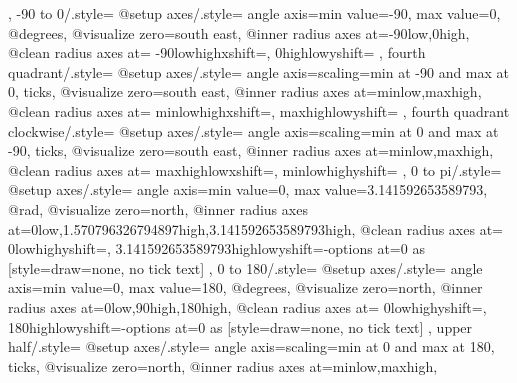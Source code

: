 {{  },
  -90 to 0/.style={
    @setup axes/.style={
      angle axis={min value=-90, max value=0},
      @degrees,
      @visualize zero=south east,
      @inner radius axes at={{-90}{low},{0}{high}},
      @clean radius axes at={%
        {-90}{low}{high}{xshift=}{},%
        {0}{high}{low}{yshift=}{}
      }
    }
  },
  fourth quadrant/.style={
    @setup axes/.style={
      angle axis={scaling=min at -90 and max at 0, ticks},
      @visualize zero=south east,
      @inner radius axes at={{min}{low},{max}{high}},
      @clean radius axes at={%
        {min}{low}{high}{xshift=}{},%
        {max}{high}{low}{yshift=}{}
      }
    }
  },
  fourth quadrant clockwise/.style={
    @setup axes/.style={
      angle axis={scaling=min at 0 and max at -90, ticks},
      @visualize zero=south east,
      @inner radius axes at={{min}{low},{max}{high}},
      @clean radius axes at={%
        {max}{high}{low}{xshift=}{},%
        {min}{low}{high}{yshift=}{}
      }
    }
  },
  0 to pi/.style={
    @setup axes/.style={
      angle axis={min value=0, max value=3.141592653589793},
      @rad,
      @visualize zero=north,
      @inner radius axes at={{0}{low},{1.570796326794897}{high},{3.141592653589793}{high}},
      @clean radius axes at={%
        {0}{low}{high}{yshift=}{},%
        {3.141592653589793}{high}{low}{yshift=-}{options at=0 as
          [{style={draw=none}, no tick text}]}
      }
    }
  },
  0 to 180/.style={
    @setup axes/.style={
      angle axis={min value=0, max value=180},
      @degrees,
      @visualize zero=north,
      @inner radius axes at={{0}{low},{90}{high},{180}{high}},
      @clean radius axes at={%
        {0}{low}{high}{yshift=}{},%
        {180}{high}{low}{yshift=-}{options at=0 as
          [{style={draw=none}, no tick text}]}
      }
    }
  },
  upper half/.style={
    @setup axes/.style={
      angle axis={scaling=min at 0 and max at 180, ticks},
      @visualize zero=north,
      @inner radius axes at={{min}{low},{max}{high}},
}}}
